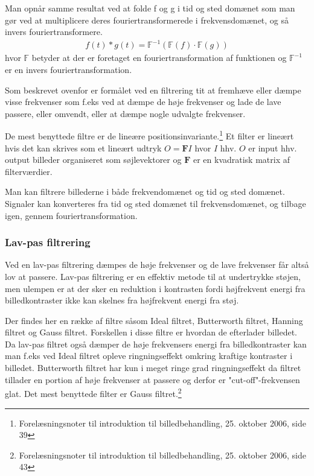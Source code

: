 Man opnår samme resultat ved at folde f og g i tid og sted domænet som man gør ved at multiplicere deres fouriertransformerede i frekvensdomænet, og så invers fouriertransformere.
\begin{align}
	f(t)*g(t) = \mathbb{F}^{-1}(\mathbb{F}(f)\cdot\mathbb{F}(g))
\end{align}
hvor $\mathbb{F}$ betyder at der er foretaget en fouriertransformation af funktionen og $\mathbb{F}^{-1}$ er en invers fouriertransformation.

Som beskrevet ovenfor er formålet ved en filtrering tit at fremhæve eller dæmpe visse frekvenser som f.eks ved at dæmpe de høje frekvenser og lade de lave passere, eller omvendt, eller at dæmpe nogle udvalgte frekvenser. 

De mest benyttede filtre er de lineære positionsinvariante.\footnote{Forelæsningsnoter til introduktion til billedbehandling, 25. oktober 2006, side 39} Et filter er lineært hvis det kan skrives som et lineært udtryk $O=\mathbf{F}I$ hvor $I$ hhv. $O$ er input hhv. output billeder organiseret som søjlevektorer og $\mathbf{F}$ er en kvadratisk matrix af filterværdier. 

Man kan filtrere billederne i både frekvendomænet og tid og sted domænet. Signaler kan konverteres fra tid og sted domænet til frekvensdomænet, og tilbage igen, gennem fouriertransformation.

\subsubsection{Lav-pas filtrering}
Ved en lav-pas filtrering dæmpes de høje frekvenser og de lave frekvenser får altså lov at passere. Lav-pas filtrering er en effektiv metode til at undertrykke støjen, men ulempen er at der sker en reduktion i kontrasten fordi højfrekvent energi fra billedkontraster ikke kan skelnes fra højfrekvent energi fra støj.

Der findes her en række af filtre såsom Ideal filtret, Butterworth filtret, Hanning filtret og Gauss filtret. Forskellen i disse filtre er hvordan de efterlader billedet. Da lav-pas filtret også dæmper de høje frekvensers energi fra billedkontraster kan man f.eks ved Ideal filtret opleve ringningseffekt omkring kraftige kontraster i billedet. Butterworth filtret har kun i meget ringe grad ringningseffekt da filtret tillader en portion af høje frekvenser at passere og derfor er "cut-off"-frekvensen glat. Det mest benyttede filter er Gauss filtret.\footnote{Forelæsningsnoter til introduktion til billedbehandling, 25. oktober 2006, side 43}

